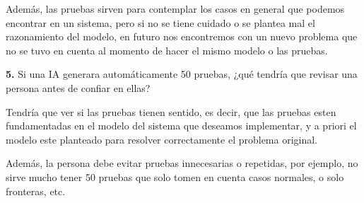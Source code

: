 \documentclass[11pt,letterpaper]{article}
\begin{document}
Además, las pruebas sirven para contemplar los casos en general que podemos encontrar en un sistema, pero si no se tiene cuidado o se plantea mal el razonamiento del modelo, en futuro nos encontremos con un nuevo problema que no se tuvo en cuenta al momento de hacer el mismo modelo o las pruebas.

\vspace{\baselineskip}

\textbf{5.} Si una IA generara automáticamente 50 pruebas, ¿qué tendría que revisar una persona antes de confiar en ellas?

Tendría que ver si las pruebas tienen sentido, es decir, que las pruebas esten fundamentadas en el modelo del sistema que deseamos implementar, y a priori el modelo este planteado para resolver correctamente el problema original.

Además, la persona debe evitar pruebas innecesarias o repetidas, por ejemplo, no sirve mucho tener 50 pruebas que solo tomen en cuenta casos normales, o solo fronteras, etc.
\end{document}
